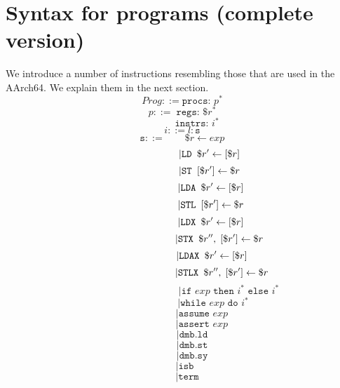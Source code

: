 \documentclass{article}
\newcommand{\var}{\texttt}
\begin{document}
\section{Syntax for programs (complete version)}
We introduce a number of instructions resembling those that are used in the AArch64. We explain them in the next section.
\vspace{-1em}
$$Prog ::= \texttt{procs: }p^*$$
$$p ::= \;\texttt{regs: } \$r^*$$
\vspace{-2em}
$$\qquad\quad\texttt{instrs: }i^*$$
$$i ::= l:\texttt{s}$$
$$\texttt{s} ::= \qquad \$r \leftarrow exp$$
\vspace{-1.7em}
$$\qquad\kern 3.5em| \var{LD } \$r' \leftarrow [\$r] $$
\vspace{-1.7em}
$$\qquad\qquad\kern 1.5em| \var{ST } [\$r'] \leftarrow \$r $$
\vspace{-1.7em}
$$\qquad\kern 3.9em| \var{LDA } \$r' \leftarrow [\$r] $$
\vspace{-1.7em}
$$\qquad\qquad\kern 1.9em| \var{STL } [\$r'] \leftarrow \$r $$
\vspace{-1.7em}
$$\qquad\kern 3.9em| \var{LDX } \$r' \leftarrow [\$r] $$
\vspace{-1.7em}
$$\qquad\qquad\kern 3.6em| \var{STX } \$r'',\; [\$r'] \leftarrow \$r $$
\vspace{-1.7em}
$$\qquad\kern 4em| \var{LDAX } \$r' \leftarrow [\$r] $$
\vspace{-1.7em}
$$\qquad\qquad\kern 4.1em| \var{STLX } \$r'',\; [\$r'] \leftarrow \$r $$
\vspace{-1.7em}
$$\qquad\qquad\qquad\qquad\quad\enspace|\texttt{if } exp \texttt{ then }i^* \texttt{ else }i^*$$
\vspace{-1.7em}
$$\qquad\qquad\qquad\;|\texttt{while } exp \texttt{ do }i^*$$
\vspace{-1.7em}
$$\qquad\qquad|\texttt{assume } exp$$
\vspace{-1.7em}
$$\qquad\qquad|\texttt{assert } exp$$
\vspace{-1.7em}
$$\qquad|\texttt{dmb.ld}$$
\vspace{-1.7em}
$$\qquad|\texttt{dmb.st}$$
\vspace{-1.7em}
$$\qquad|\texttt{dmb.sy}$$
\vspace{-1.7em}
$$\enspace|\texttt{isb}$$
\vspace{-1.7em}
$$\quad|\texttt{term}$$
\end{document}
